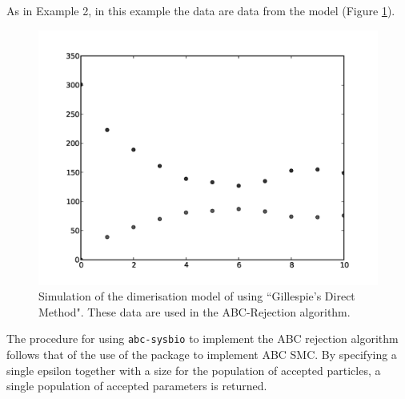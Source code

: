 \documentclass[a4paper]{report}
\begin{document}
As in Example 2, in this example the data are data from the model (Figure \ref{DimerisationData}).
\begin{figure}[htbp]
\begin{center}
\includegraphics[width=1.0\textwidth]{Graphics/DimerisationData.png}
\caption{Simulation of the dimerisation model of \cite{Gillespie1977} using ``Gillespie's Direct Method". These data are used in the ABC-Rejection algorithm.}
\label{DimerisationData}
\end{center}
\end{figure}
The procedure for using \verb$abc-sysbio$ to implement the ABC rejection algorithm follows that of the use of the package to implement ABC SMC. By specifying a single epsilon together with a size for the population of accepted particles, a single population of accepted parameters is returned.
\end{document}
